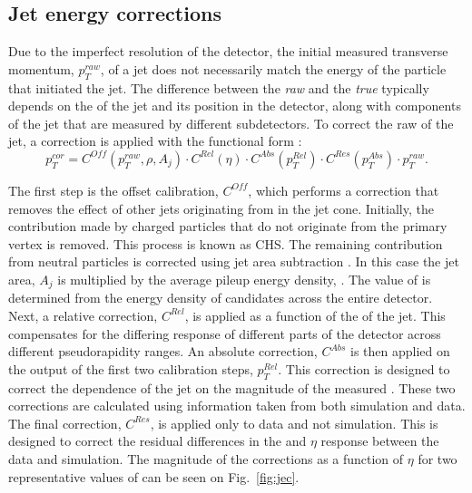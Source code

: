 \subsection{Jet energy corrections}
\label{sec:reco_jec}

Due to the imperfect resolution of the \CMS detector, the initial
measured transverse momentum, $p_T^{raw}$, of a jet does not
necessarily match the energy of the particle that initiated the jet.
The difference between the \emph{raw} \pT and the \emph{true} \pT typically
depends on the \pT of the jet and its position in the detector, along
with components of the jet that are measured by different
subdetectors. To correct the raw \pT of the jet, a correction is
applied with the functional form
\cite{1748-0221-6-11-P11002}:
\begin{equation}
p_T^{cor}=C^{Off}(p_T^{raw},\rho,A_j)\cdot C^{Rel}(\eta)\cdot
C^{Abs}(p_T^{Rel})\cdot C^{Res}(p_T^{Abs})\cdot p_T^{raw}.
\end{equation}

The first step is the offset calibration, $C^{Off}$, which performs a correction
that removes the effect of other jets originating from \PU in the jet
cone. Initially, the contribution made by charged particles that do
not originate from the primary vertex is removed. This process is
known as \ac{CHS}. The remaining contribution from neutral \PU
particles is corrected using jet area subtraction
\cite{Cacciari:2007fd}. In this case the jet area, $A_j$ is multiplied
by the average pileup energy density, \rho. The value of \rho is
determined from the energy density of \PF candidates across the entire
detector.  Next, a relative correction, $C^{Rel}$, is applied as a
function of the \eta of the jet. This compensates for the differing
response of different parts of the detector across different
pseudorapidity ranges. An absolute correction, $C^{Abs}$ is then
applied on the output of the first two calibration steps, $p_T^{Rel}$.
This correction is designed to correct the dependence of the jet \pT
on the magnitude of the measured \pT. These two corrections are
calculated using information taken from both simulation and data. %
The final correction, $C^{Res}$, is applied only to data and not
simulation. This is designed to correct the residual differences in
the \pT and $\eta$ response between the data and simulation. The
magnitude of the corrections as a function of $\eta$ for two
representative values of \pT can be seen on Fig.~\ref{fig:jec}.


